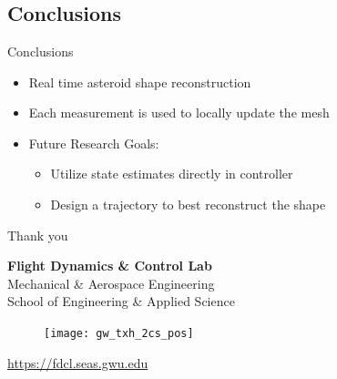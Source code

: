 \documentclass[11pt,professionalfonts]{beamer}
\begin{document}
\section*{}
\subsection*{Conclusions}

\begin{frame}{Conclusions}
    \begin{itemize}
        \item Real time asteroid shape reconstruction 
        \item Each measurement is used to locally update the mesh
        \item Future Research Goals:
            \begin{itemize}
                \item Utilize state estimates directly in controller
                \item Design a trajectory to best reconstruct the shape
            \end{itemize}
    \end{itemize} 
\end{frame}

\begin{frame}[c]{Thank you}
  \centering
  
  \textbf{\large Flight Dynamics \& Control Lab} \\
  Mechanical \& Aerospace Engineering \\
  School of Engineering \& Applied Science
  
  \begin{figure} %
        \texttt{[image: gw\_txh\_2cs\_pos]}
    \end{figure}
  
  \url{https://fdcl.seas.gwu.edu}
\end{frame}
\end{document}

